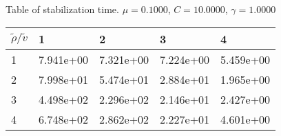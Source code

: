 \begin{center}
Table of stabilization time. $\mu = 0.1000$, $C = 10.0000$, $\gamma = 1.0000$
  
\begin{tabular}{|p{0.8in}|p{0.8in}|p{0.8in}|p{0.8in}|p{0.8in}|} \hline
$\tilde{\rho} / \tilde{v}$ &1 &2 &3 &4 \\ \hline 
1 &7.941e+00 &7.321e+00 &7.224e+00 &5.459e+00 \\ \hline 
2 &7.998e+01 &5.474e+01 &2.884e+01 &1.965e+00 \\ \hline 
3 &4.498e+02 &2.296e+02 &2.146e+01 &2.427e+00 \\ \hline 
4 &6.748e+02 &2.862e+02 &2.227e+01 &4.601e+00 \\ \hline 

\end{tabular}\\[20pt]
\end{center}
